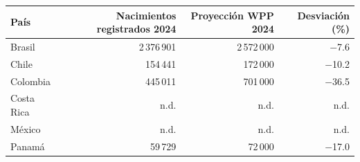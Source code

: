 \begin{tabular}{lrrr}
\toprule
País & Nacimientos registrados 2024 & Proyección WPP 2024 & Desviación (\%) \\
\midrule
Brasil & 2\,376\,901 & 2\,572\,000 & $-$7.6 \\
Chile & 154\,441 & 172\,000 & $-$10.2 \\
Colombia & 445\,011 & 701\,000 & $-$36.5 \\
Costa Rica & n.d. & n.d. & n.d. \\
México & n.d. & n.d. & n.d. \\
Panamá & 59\,729 & 72\,000 & $-$17.0 \\
\bottomrule
\end{tabular}
